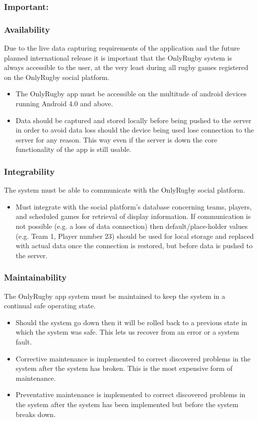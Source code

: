 	\subsubsection{Important:}

	\subsubsection*{Availability}
	Due to the live data capturing requirements of the application and the future planned international release it is important that the OnlyRugby system is always accessible to the user, at the very least during all rugby games registered on the OnlyRugby social platform.
	\begin{itemize}
		\item The OnlyRugby app must be accessible on the multitude of android devices running Android 4.0 and above.
		\item Data should be captured and stored locally before being pushed to the server in order to avoid data loss should the device being used lose connection to the server for any reason. This way even if the server is down the core functionality of the app is still usable.
	\end{itemize}

	\subsubsection*{Integrability}
	The system must be able to communicate with the OnlyRugby social platform.
	\begin{itemize}
		\item Must integrate with the social platform's database concerning teams, players, and scheduled games for retrieval of display information. If communication is not possible (e.g. a loss of data connection) then default/place-holder values (e.g. Team 1, Player number 23) should be used for local storage and replaced with actual data once the connection is restored, but before data is pushed to the server.
	\end{itemize}
	\subsubsection*{Maintainability}
	The OnlyRugby app system must be maintained to keep the system in a continual safe operating state.
	\begin{itemize}
		\item Should the system go down then it will be rolled back to a previous state in which the system was safe. This lets us recover from an error or a system fault.
		\item Corrective maintenance is implemented to correct discovered problems in the system after the system has broken. This is the most expensive form of maintenance.
		\item Preventative maintenance is implemented to correct discovered problems in the system after the system has been implemented but before the system breaks down.
	\end{itemize}
	
